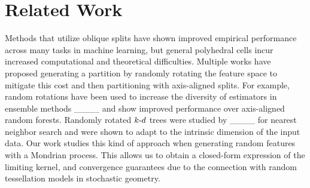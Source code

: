 \section{Related Work}
Methods that utilize oblique splits have shown improved empirical performance across many tasks in machine learning, but general polyhedral cells incur increased computational and theoretical difficulties. Multiple works have proposed generating a partition by randomly rotating the feature space to mitigate this cost and then partitioning with axis-aligned splits. For example, random rotations have been used to increase the diversity of estimators in ensemble methods ____ and show improved performance over axis-aligned random forests. Randomly rotated $k{\text -}d$ trees were studied by ____ for nearest neighbor search and were shown to adapt to the intrinsic dimension of the input data. Our work studies this kind of approach when generating random features with a Mondrian process. This allows us to obtain a closed-form expression of the limiting kernel, and convergence guarantees due to the connection with random tessellation models in stochastic geometry.